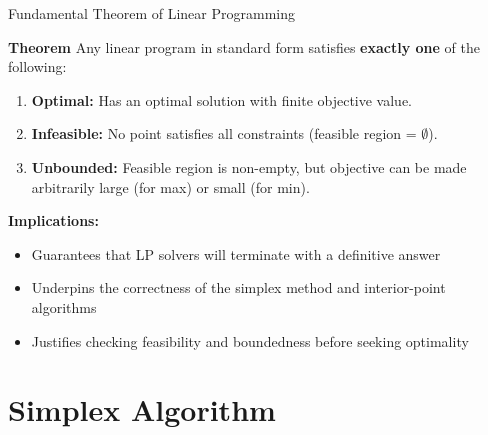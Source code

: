 \documentclass{beamer}
\begin{document}
\begin{frame}{Fundamental Theorem of Linear Programming}
  \footnotesize
  
  \textbf{Theorem} 
  Any linear program in standard form satisfies \textbf{exactly one} of the following:
  
  
  \begin{enumerate} %
    \item \textbf{Optimal:} Has an optimal solution with finite objective value.
    \item \textbf{Infeasible:} No point satisfies all constraints (feasible region = $\emptyset$).
    \item \textbf{Unbounded:} Feasible region is non-empty, but objective can be made arbitrarily large (for max) or small (for min).
  \end{enumerate}
  
  \bigskip
  \bigskip
  \bigskip

  \textbf{Implications:}
  \begin{itemize} %
    \item Guarantees that LP solvers will terminate with a definitive answer
    \item Underpins the correctness of the simplex method and interior-point algorithms
    \item Justifies checking feasibility and boundedness before seeking optimality
  \end{itemize}

\end{frame}


\section{Simplex Algorithm}
\end{document}
